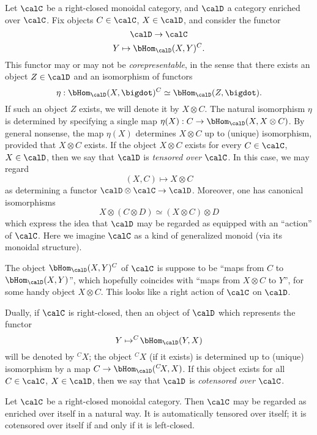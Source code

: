 \begin{CategoryTheory}
Let $\calC$ be a right-closed monoidal category, and $\calD$ a category enriched over $\calC$.
Fix objects $C \in \calC$, $X \in \calD$, and consider the functor
$$ \calD \rightarrow \calC$$
$$ Y \mapsto \bHom_{\calD}(X,Y)^{C}.$$
This functor may or may not be {\em corepresentable}, in the sense that there exists an object
$Z \in \calD$ and an isomorphism of functors
$$ \eta: \bHom_{\calD}(X, \bigdot)^{C} \simeq \bHom_{\calD}(Z, \bigdot).$$
If such an object $Z$ exists, we will denote it by $X \otimes C$. The natural isomorphism $\eta$ is determined by specifying a single map $\eta(X): C \rightarrow \bHom_{\calD}(X, X \otimes C)$. By general nonsense, the map $\eta(X)$ determines $X \otimes C$ up to (unique) isomorphism, provided that $X \otimes C$ exists. If the object $X \otimes C$ exists for every $C \in \calC$, $X \in \calD$, then we say that $\calD$ is {\it tensored over $\calC$}. In this case, we may regard $$(X,C) \mapsto X \otimes C$$
as determining a functor $\calD \otimes \calC \rightarrow \calD$. Moreover, one has canonical
isomorphisms $$X \otimes (C \otimes D) \simeq (X \otimes C) \otimes D$$
which express the idea that $\calD$ may be regarded as equipped with an ``action'' of $\calC$. Here we imagine $\calC$ as a kind of generalized monoid (via its monoidal structure).
\begin{shaded}
The object $\bHom_{\calD}(X,Y)^{C}$ of $\calC$ is suppose to be ``maps from $C$ to $\bHom_{\calD}(X,Y)$'', which hopefully coincides with ``maps from $X\otimes C$ to $Y$'', for some handy object $X\otimes C$. This looks like a right action of $\calC$ on $\calD$.
\end{shaded}

Dually, if $\calC$ is right-closed, then an object of $\calD$ which represents the functor
$$ Y \mapsto ^{C}\!\bHom_{\calD}(Y,X)$$
will be denoted by $^{C}\!X$; the object $^{C}\!X$ (if it exists) is determined up to (unique) isomorphism by a map $C \rightarrow \bHom_{\calD}(^{C}\!X,X)$. 
If this object exists for all $C \in \calC$, $X \in \calD$, then we say that
$\calD$ is {\it cotensored over $\calC$}.

\begin{example}
Let $\calC$ be a right-closed monoidal category. Then $\calC$ may be regarded as enriched over itself in a natural way. It is automatically tensored over itself; it is cotensored over itself if and only if it is left-closed.
\end{example}


\end{CategoryTheory}
